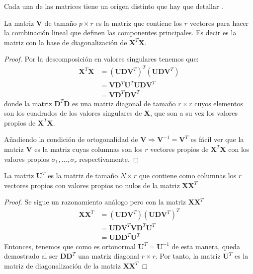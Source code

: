 \noindent Cada una de las matrices tiene un origen distinto que hay que detallar \cite{Johnson 1963}.

\begin{propo}
La matriz $\mathbf{V}$ de tamaño $p\times r$ es la matriz que contiene los $r$ vectores para hacer la combinación lineal que definen las componentes principales. Es decir es la matriz con la base de diagonalización de $\mathbf{X}^T\mathbf{X}$.
\begin{proof}
Por la descomposición en valores singulares tenemos que:
\begin{align*}
\textbf{X}^T \textbf{X} &= (\textbf{U}\mathbf{D} \textbf{V}^T)^T (\textbf{U}\mathbf{D} \textbf{V}^T)\\
&= \textbf{V}\mathbf{D} ^T \textbf{U}^T \textbf{U}\mathbf{D} \textbf{V}^T\\
&= \textbf{V}\mathbf{D} ^T \mathbf{D} \textbf{V}^T
\end{align*}
donde la matriz $\mathbf{D} ^T \mathbf{D} $ es una matriz diagonal de tamaño $r \times r$ cuyos elementos son los cuadrados de los valores singulares de \textbf{X}, que son a su vez los valores propios de $\textbf{X}^T \textbf{X}$. 

\noindent Añadiendo la condición de ortogonalidad de $\textbf{V}\Rightarrow \textbf{V}^{-1}=\mathbf{V}^T$ es fácil ver que la matriz \textbf{V} es la matriz cuyas columnas son los $r$ vectores propios de $\textbf{X}^T\textbf{X}$ con los valores propios $\sigma_1,\ldots, \sigma_r$ respectivamente.
\end{proof}
\end{propo}

\begin{propo}
La matriz $\mathbf{U}^T$ es la matriz de tamaño $N\times r$ que contiene como columnas los $r$ vectores propios con valores propios no nulos de la matriz $\mathbf{XX}^T$
\begin{proof}
Se sigue un razonamiento análogo pero con la matriz $\mathbf{XX}^T$
\begin{align*}
\textbf{X} \textbf{X}^T  &= (\textbf{U}\mathbf{D} \textbf{V}^T)(\textbf{U}\mathbf{D} \textbf{V}^T)^T\\
&= \mathbf{UDV}^T\mathbf{VD}^T\mathbf{U}^T\\
&= \mathbf{UDD}^T\mathbf{U}^T
\end{align*}
Entonces, tenemos que como es ortonormal $\mathbf{U}^T=\mathbf{U}^{-1}$ de esta manera, queda demostrado al ser $\mathbf{DD}^T$ una matriz diagonal $r\times r$. Por tanto, la matriz $\mathbf{U}^T$ es la matriz de diagonalización de la matriz $\mathbf{XX}^T$
\end{proof}
\end{propo}

